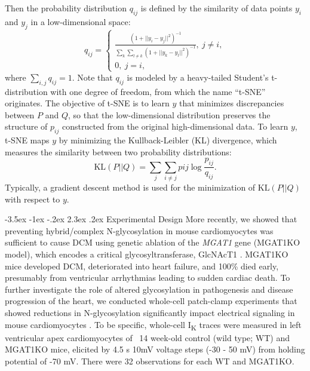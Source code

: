\documentclass[11pt]{article}
\makeatletter
\renewcommand\section{\@startsection {section}{1}{\z@}%
                                   {-3.5ex \@plus -1ex \@minus -.2ex}%
                                   {2.3ex \@plus.2ex}%
                                   {\normalfont\fontfamily{phv}\fontsize{16}{19}\bfseries}}
\makeatother
\begin{document}
Then the probability distribution $q_{ij}$ is defined by the similarity of data points $y_i$ and $y_j$ in a low-dimensional space:
\begin{equation}
    q_{ij} = 
    \begin{cases}\frac{(1+||y_{i}-y_{j}||^{2})^{-1}}{\sum\limits_{k}\sum\limits_{l \neq k}(1+||y_{k}-y_{l}||^{2})^{-1}}, \ j \neq i, \\
    0, \ j=i,
    \end{cases}
\end{equation}
where $\sum\limits_{i,j}q_{ij}=1$. Note that $q_{ij}$ is modeled by a heavy-tailed Student's t-distribution with one degree of freedom, from which the name ``t-SNE'' originates. The objective of t-SNE is to learn $y$ that minimizes discrepancies between $P$ and $Q$, so that the low-dimensional distribution preserves the structure of $p_{ij}$ constructed from the original high-dimensional data. To learn $y$, t-SNE maps $y$ by minimizing the Kullback-Leibler (KL) divergence, which measures the similarity between two probability distributions:
\begin{equation}
    \mathrm{KL}(P||Q) = \sum\limits_{j}\sum\limits_{i \neq j}p{ij}\log \frac{p_{ij}}{q_{ij}}.
\end{equation}
Typically, a gradient descent method is used for the minimization of $\mathrm{KL}(P||Q)$ with respect to $y$.

\section{Experimental Design}
More recently, we showed that preventing hybrid/complex N-glycosylation in mouse cardiomyocytes was sufficient to cause DCM using genetic ablation of the \textit{MGAT1} gene (MGAT1KO model), which encodes a critical glycosyltransferase, GlcNAcT1 \citep{ednie2019reduced2}. MGAT1KO mice developed DCM, deteriorated into heart failure, and 100\% died early, presumably from ventricular arrhythmias leading to sudden cardiac death. To further investigate the role of altered glycosylation in pathogenesis and disease progression of the heart, we conducted whole-cell patch-clamp experiments that showed reductions in N-glycosylation significantly impact electrical signaling in mouse cardiomyocytes \citep{ednie2019reduced}. To be specific, whole-cell I\textsubscript{K} traces were measured in left ventricular apex cardiomyocytes of ~14 week-old control (wild type; WT) and MGAT1KO mice, elicited by 4.5 s 10mV voltage steps (-30 - 50 mV) from holding potential of -70 mV. There were 32 observations for each WT and MGAT1KO.
\end{document}
